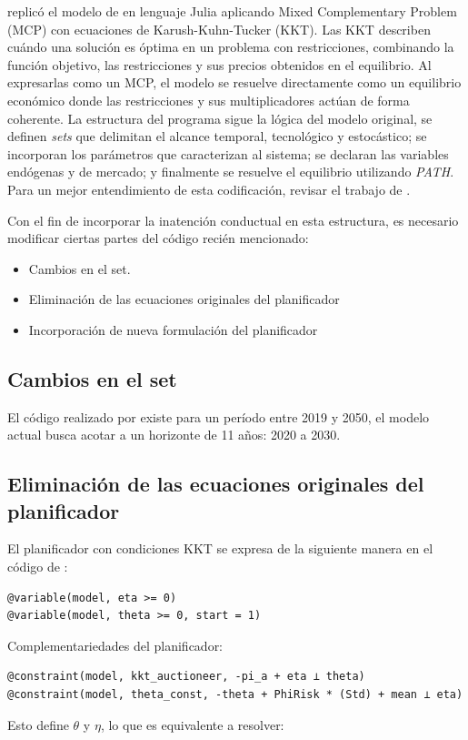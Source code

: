  replicó el modelo de  en lenguaje Julia aplicando Mixed Complementary Problem (MCP) con ecuaciones de Karush-Kuhn-Tucker (KKT).  Las KKT describen cuándo una solución es óptima en un problema con restricciones, combinando la función objetivo, las restricciones y sus precios obtenidos en el equilibrio. Al expresarlas como un MCP, el modelo se resuelve directamente como un equilibrio económico donde las restricciones y sus multiplicadores actúan de forma coherente. La estructura del programa sigue la lógica del modelo original, se definen \textit{sets} que delimitan el alcance temporal, tecnológico y estocástico; se incorporan los parámetros que caracterizan al sistema; se declaran las variables endógenas y de mercado; y finalmente se resuelve el equilibrio utilizando \textit{PATH}. Para un mejor entendimiento de esta codificación, revisar el trabajo de \cite{munoz_lhuillier_inversion_2022}.

Con el fin de incorporar la inatención conductual en esta estructura, es necesario modificar ciertas partes del código recién mencionado: 

\begin{itemize}
    \item Cambios en el set.
    \item Eliminación de las ecuaciones originales del planificador 
    \item Incorporación de nueva formulación del planificador
\end{itemize}

\subsection{Cambios en el set}
El código realizado por  existe para un período entre 2019 y 2050, el modelo actual busca acotar a un horizonte de 11 años: 2020 a 2030. 

\subsection{Eliminación de las ecuaciones originales del planificador}
El planificador con condiciones KKT se expresa de la siguiente manera en el código de :
\begin{verbatim}
@variable(model, eta >= 0)   
@variable(model, theta >= 0, start = 1) 
\end{verbatim}
Complementariedades del planificador:
\begin{verbatim}
@constraint(model, kkt_auctioneer, -pi_a + eta ⟂ theta)
@constraint(model, theta_const, -theta + PhiRisk * (Std) + mean ⟂ eta)
\end{verbatim}
Esto define $\theta$ y $\eta$, lo que es equivalente a resolver:


